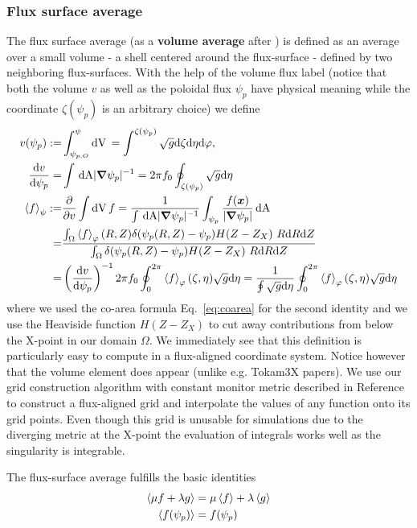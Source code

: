 \subsubsection{Flux surface average}


The flux surface average (as a {\bf volume average} after \cite{haeseleer}) is defined as an average over a
small volume - a shell centered around the flux-surface - defined by two neighboring flux-surfaces.
With the help of the volume
flux label (notice that both the volume $v$ as well as the poloidal flux $\psi_p$ have physical
meaning while the coordinate $\zeta(\psi_p)$ is an arbitrary choice) we define
\begin{align} \label{eq:fsa_vol}
v(\psi_p) :=& \int_{\psi_{p,O}}^\psi \mathrm{dV}\, = \int^{\zeta(\psi_p)} \sqrt{g}\mathrm{d}\zeta\mathrm{d}\eta\mathrm{d}\varphi,
\\
\frac{\mathrm{d} v}{\mathrm{d}\psi_p} =& \int\,\mathrm{dA} |{\boldsymbol{\nabla}}\psi_p|^{-1} = 2\pi f_0\oint_{\zeta(\psi_p)} \sqrt{g}\mathrm{d}\eta \\
\left \langle  f  \right \rangle_\psi :=& \frac{\partial}{\partial v} \int \mathrm{dV}\, f
 = \frac{1}{\int \,\mathrm{dA} |{\boldsymbol{\nabla}}\psi_p|^{-1} } \int_{\psi_p} \frac{f({\boldsymbol{x}})}{|{\boldsymbol{\nabla}}\psi_p|} \,\mathrm{dA} \nonumber\\
=& \frac{\int_\Omega \left \langle  f \right\rangle_\varphi(R,Z) \delta(\psi_p(R,Z)-\psi_{p})H(Z-Z_X)\ R \mathrm{d} R \mathrm{d} Z}
{\int_\Omega \delta(\psi_p(R,Z)-\psi_{p})H(Z-Z_X)\ R \mathrm{d} R \mathrm{d} Z}\nonumber\\
 =& \left(\frac{\mathrm{d} v}{\mathrm{d}\psi_p }\right)^{-1} 2\pi f_0 \oint_0^{2\pi} \left \langle  f \right\rangle_\varphi(\zeta,\eta) \sqrt{g}\mathrm{d}\eta
 = \frac{1}{\oint \sqrt{g}\mathrm{d}\eta } \oint_0^{2\pi} \left \langle  f \right\rangle_\varphi(\zeta,\eta) \sqrt{g}\mathrm{d}\eta
\end{align}
where we used the co-area formula Eq.~\eqref{eq:coarea} for the second identity
and we use the Heaviside function $H(Z-Z_X)$ to cut away contributions from below the X-point
in our domain $\Omega$.
 We immediately see that this definition is particularly easy to compute
 in a flux-aligned coordinate system. Notice however that the volume element
 does appear (unlike e.g. Tokam3X papers).
 We use our grid construction algorithm with constant monitor metric described in Reference~\cite{Wiesenberger2018} to construct a flux-aligned grid and interpolate
 the values of any function onto its grid points.
 Even though this grid is unusable for simulations due to the diverging metric at the X-point the
 evaluation of integrals works well as the singularity is integrable.

The flux-surface average fulfills the basic identities
\begin{align}
\label{eq:fsa_identities}
\left \langle  \mu f + \lambda g \right \rangle &= \mu\left \langle  f \right \rangle + \lambda \left \langle  g \right \rangle \\
\left \langle  f(\psi_p) \right \rangle &= f(\psi_p)
\end{align}

